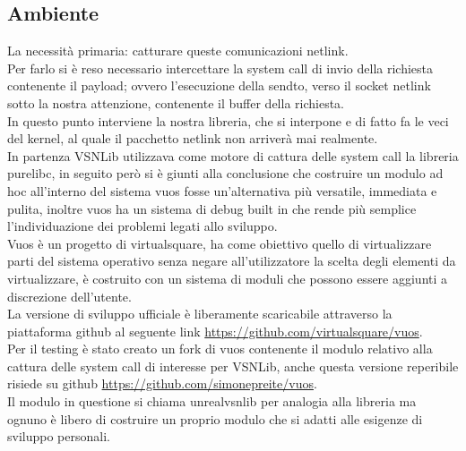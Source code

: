 \subsection{Ambiente}
La necessit\`a primaria: catturare queste comunicazioni netlink.\\
Per farlo si \`e reso necessario intercettare la system call di invio della richiesta contenente il payload; ovvero l'esecuzione della sendto, verso il socket netlink sotto la nostra attenzione, contenente il buffer della richiesta.\\
In questo punto interviene la nostra libreria, che si interpone e di fatto fa le veci del kernel, al quale il pacchetto netlink non arriver\`a mai realmente.\\
In partenza VSNLib utilizzava come motore di cattura delle system call la libreria purelibc\cite{K8}, in seguito per\`o si \`e giunti alla conclusione che costruire un modulo ad hoc all'interno del sistema vuos fosse un'alternativa pi\`u versatile, immediata e pulita, inoltre vuos ha un sistema di debug built in che rende pi\`u semplice l'individuazione dei problemi legati allo sviluppo.\\
Vuos\cite{K5} \`e un progetto di virtualsquare, ha come obiettivo quello di virtualizzare parti del sistema operativo senza negare all'utilizzatore la scelta degli elementi da virtualizzare, \`e costruito con un sistema di moduli che possono essere aggiunti a discrezione dell'utente.\\
La versione di sviluppo ufficiale \`e liberamente scaricabile attraverso la piattaforma github al seguente link \url{https://github.com/virtualsquare/vuos}. \\
Per il testing \`e stato creato un fork di vuos contenente il modulo relativo alla cattura delle system call di interesse per VSNLib, anche questa versione reperibile risiede su github \url{https://github.com/simonepreite/vuos}.\\
Il modulo in questione si chiama unrealvsnlib per analogia alla libreria ma ognuno \`e libero di costruire un proprio modulo che si adatti alle esigenze di sviluppo personali.\\

